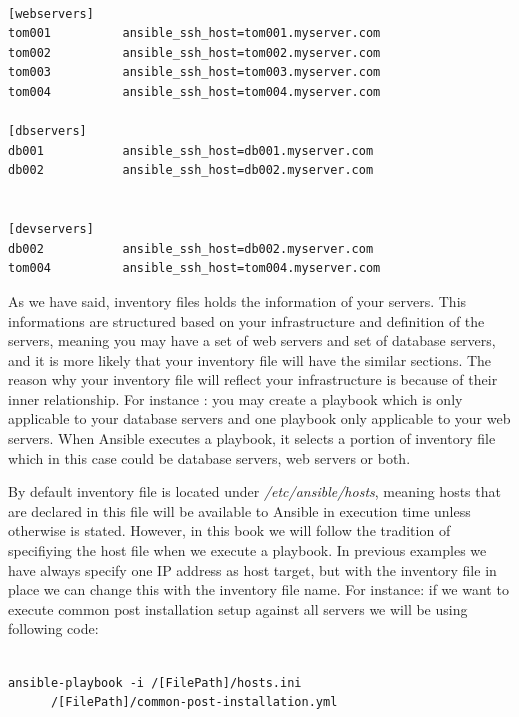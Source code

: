 \documentclass[10pt]{book}
\begin{document}
\begin{verbatim}

[webservers]
tom001			ansible_ssh_host=tom001.myserver.com 
tom002			ansible_ssh_host=tom002.myserver.com 
tom003			ansible_ssh_host=tom003.myserver.com 
tom004			ansible_ssh_host=tom004.myserver.com 

[dbservers]
db001			ansible_ssh_host=db001.myserver.com
db002			ansible_ssh_host=db002.myserver.com


[devservers]
db002			ansible_ssh_host=db002.myserver.com
tom004			ansible_ssh_host=tom004.myserver.com 

\end{verbatim}

As we have said, inventory files holds the information of 
your servers. This informations are structured based on your 
infrastructure and definition of the servers, meaning you may have a set of web 
servers and set of database servers, and it is more likely that your inventory 
file will have the similar sections. The reason why your inventory file will reflect your 
infrastructure is because of their inner relationship.
For instance : you may create a playbook which is only applicable to your 
database servers and one playbook only applicable to your web servers. When 
Ansible executes a playbook, it selects a portion of inventory file which in 
this case could be database servers, web servers or both. 


By default inventory file is located under \textit{/etc/ansible/hosts}, meaning hosts that are declared 
in this file will be available to Ansible in execution time unless otherwise is stated. However, in this book
we will follow the tradition of specifiying the host file when we execute a playbook. 
In previous examples we have always specify one IP address as host target, but 
with the inventory file in place we can change this with the inventory file 
name. For instance: if we want to execute common post installation setup against 
all servers we will be using following code:

\begin{Verbatim} 

ansible-playbook -i /[FilePath]/hosts.ini  
      /[FilePath]/common-post-installation.yml 
  
\end{Verbatim}
\end{document}
